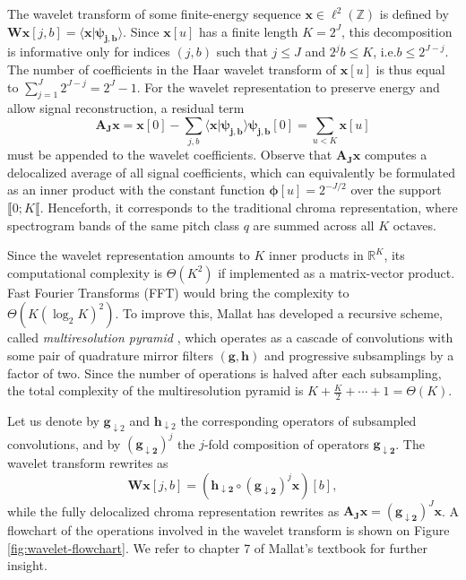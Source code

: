 \documentclass{article}
\makeatletter
\newcommand*{\ie}{i.e.\@\xspace}
\makeatother
\begin{document}
The wavelet transform of some finite-energy sequence
$\boldsymbol{x} \in \ell^2(\mathbb{Z})$ is defined by
$\mathbf{W} \boldsymbol{x}[j, b]
= \langle \boldsymbol{x} \vert \boldsymbol{\psi_{j,b}} \rangle$.
Since $\boldsymbol{x}[u]$ has a finite length $K = 2^J$,
this decomposition is informative only for indices $(j, b)$
such that $j \leq J$ and $2^j b \leq K$, \ie $b\leq2^{J-j}$.
The number of coefficients in the Haar wavelet transform of $\boldsymbol{x}[u]$ is thus equal to
$\sum_{j =1}^{J} 2^{J-j} = 2^J - 1$. For the wavelet representation to
preserve energy and allow signal reconstruction, a residual term
\begin{equation}
\boldsymbol{\mathbf{A}_J} \boldsymbol{x}
= \boldsymbol{x}[0] -
\sum_{j,b}
\langle \boldsymbol{x} \vert \boldsymbol{\psi_{j,b}} \rangle \boldsymbol{\psi_{j,b}}[0]
= \sum_{u<K} \boldsymbol{x}[u]
\label{eq:lowpass-term}
\end{equation}
must be appended to the wavelet coefficients.
Observe that $\boldsymbol{\mathbf{A}_J}  \boldsymbol{x}$
computes a delocalized average of all signal coefficients,
which can equivalently be formulated as an inner product with the constant
function $\boldsymbol{\phi}[u] = 2^{-J/2}$ over the support $\llbracket 0 ; K \llbracket$.
Henceforth, it corresponds to the traditional chroma representation, where spectrogram bands
of the same pitch class $q$ are summed across all $K$ octaves.

Since the wavelet representation amounts to $K$ inner products in $\mathbb{R}^K$,
its computational complexity is $\Theta(K^2)$ if implemented as a matrix-vector product.
Fast Fourier Transforms (FFT) would bring the complexity to
$\Theta{(K (\log_2 K)^2)}$.
To improve this, Mallat has developed a recursive scheme, called
\emph{multiresolution pyramid} \cite{mallat1989theory}, which operates as a cascade
of convolutions with some pair of quadrature mirror filters
$(\boldsymbol{g}, \boldsymbol{h})$ and progressive subsamplings by a factor of two.
Since the number of operations is halved after each subsampling, the total
complexity of the multiresolution pyramid is $K + \frac{K}{2} + \cdots + 1 = \Theta(K)$.

Let us denote by $\boldsymbol{g}_{\downarrow 2}$ and
$\boldsymbol{h}_{\downarrow 2}$ the corresponding operators of subsampled
convolutions, and by $(\boldsymbol{g_{\downarrow 2}})^j$ the $j$-fold composition
of operators $\boldsymbol{g_{\downarrow 2}}$.
The wavelet transform rewrites as
\begin{equation}
\mathbf{W}\boldsymbol{x}[j,b] =
\left(
\boldsymbol{h_{\downarrow 2}} \circ
(\boldsymbol{g_{\downarrow 2}})^j \boldsymbol{x}
\right)[b],
\end{equation}
while the fully delocalized chroma representation rewrites as
$\boldsymbol{\mathbf{A}_J} \boldsymbol{x} =
(\boldsymbol{g_{\downarrow 2}})^J \boldsymbol{x}$.
A flowchart of the operations involved in the wavelet transform is shown on
Figure \ref{fig:wavelet-flowchart}.
We refer to chapter 7 of Mallat's textbook \cite{mallat2008wavelet}
for further insight.
\end{document}
